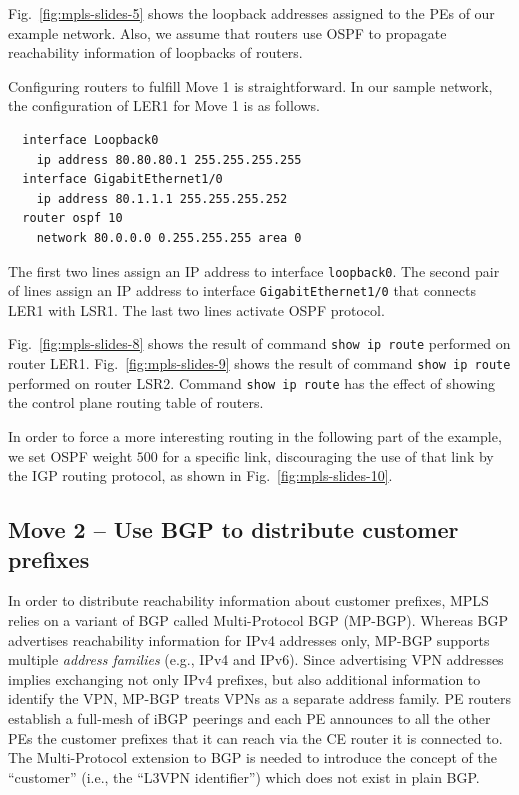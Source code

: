 \documentclass{article}
\newenvironment{codice}
{
\noindent
\begin{minipage}[b]{\columnwidth}
\definecolor{shadecolor}{rgb}{1,1,1}
\begin{framed}}
{
\vspace{-0.4cm}
\end{framed}
\end{minipage}
\definecolor{shadecolor}{rgb}{1,1,0.7}
}
\begin{document}
\begin{shaded}
\noindent
Fig.~\ref{fig:mpls-slides-5}
shows the loopback addresses assigned to the PEs of our example network. Also, we assume
that routers use OSPF to propagate reachability information of loopbacks of
routers.

Configuring routers to fulfill Move 1 is straightforward. In our sample network, 
the configuration of LER1 for Move 1 is as follows.

\begin{codice}
\begin{verbatim}
  interface Loopback0
    ip address 80.80.80.1 255.255.255.255
  interface GigabitEthernet1/0
    ip address 80.1.1.1 255.255.255.252
  router ospf 10
    network 80.0.0.0 0.255.255.255 area 0
\end{verbatim}
\end{codice}

The first two lines assign an IP address to interface \texttt{loopback0}. The second pair
of lines assign an IP address to interface \texttt{GigabitEthernet1/0} that connects LER1
with LSR1. The last two lines activate OSPF protocol.

Fig.~\ref{fig:mpls-slides-8} shows the result of command {\tt show ip route} performed on
router LER1. Fig.~\ref{fig:mpls-slides-9} shows the result of command {\tt show ip route} 
performed on router LSR2. Command {\tt show ip route} has the effect of showing the
control plane routing table of routers.

In order to force a more interesting routing in
the following part of the example, we set OSPF weight $500$ for a specific link,
discouraging the use of that link by the IGP routing
protocol, as shown in Fig.~\ref{fig:mpls-slides-10}. 
\end{shaded}

\subsection{Move 2 -- Use BGP to distribute customer prefixes}
In order to distribute reachability information about customer prefixes, MPLS 
relies on a variant of BGP called Multi-Protocol BGP (MP-BGP)\cite{rfc2858}. 
Whereas BGP advertises reachability information for IPv4 addresses only, MP-BGP 
supports multiple \emph{address families} (e.g., IPv4 and IPv6). Since 
advertising VPN addresses implies exchanging not only IPv4 prefixes, but also 
additional information to identify the VPN, MP-BGP treats VPNs as a separate 
address family. PE routers establish a full-mesh of iBGP peerings and each PE 
announces to all the other PEs the customer prefixes that it can reach via the 
CE router it is connected to. The Multi-Protocol extension to BGP is needed to 
introduce the concept of the ``customer'' (i.e., the ``L3VPN identifier'') which 
does not exist in plain BGP. 
\end{document}

